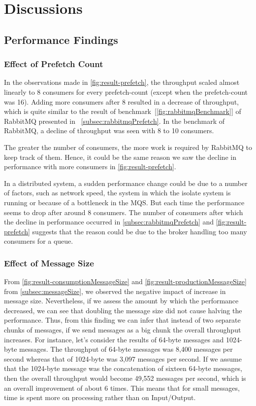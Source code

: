 \chapter{Discussions}\label{chapter:discussions}

\section{Performance Findings}
\subsection{Effect of Prefetch Count}
\label{subsec:discussion-prefetch}
  In the observations made in \autoref{fig:result-prefetch}, the throughput scaled almost linearly to 8 consumers for every prefetch-count (except when the prefetch-count was 16). Adding more consumers after 8 resulted in a decrease of throughput, which is quite similar to the result of benchmark~[\autoref{fig:rabbitmqBenchmark}] of RabbitMQ presented in ~\autoref{subsec:rabbitmqPrefetch}. In the benchmark of RabbitMQ, a decline of throughput was seen with 8 to 10 consumers.

  The greater the number of consumers, the more work is required by RabbitMQ to keep track of them. Hence, it could be the same reason we saw the decline in performance with more consumers in \autoref{fig:result-prefetch}.

  In a distributed system, a sudden performance change could be due to a number of factors, such as network speed, the system in which the isolate system is running or because of a bottleneck in the MQS. But each time the performance seems to drop after around 8 consumers. The number of consumers after which the decline in performance occurred in \autoref{subsec:rabbitmqPrefetch} and \autoref{fig:result-prefetch} suggests that the reason could be due to the broker handling too many consumers for a queue.

\subsection{Effect of Message Size}
  From \autoref{fig:result-consumptionMessageSize} and \autoref{fig:result-productionMessageSize} from \autoref{subsec:messageSize}, we observed the negative impact of increase in message size. Nevertheless, if we assess the amount by which the performance decreased, we can see that doubling the message size did not cause halving the performance. Thus, from this finding we can infer that instead of two separate chunks of messages, if we send messages as a big chunk the overall throughput increases. For instance, let's consider the results of 64-byte messages and 1024-byte messages. The throughput of 64-byte messages was 8,400 messages per second whereas that of 1024-byte was 3,097 messages per second. If we assume that the 1024-byte message was the concatenation of sixteen 64-byte messages, then the overall throughput would become 49,552 messages per second, which is an overall improvement of about 6 times. This means that for small messages, time is spent more on processing rather than on Input/Output.

